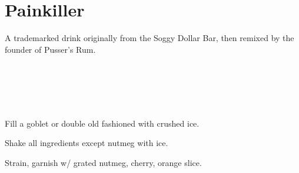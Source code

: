 \section[Painkiller]{Painkiller~}


\begin{recipestats}[
	servings=1,
	preptime=5~\minute,
	original=\citefield{pussersPainkiller}{shorttitle} \cite{pussersPainkiller}
]
\end{recipestats}


\begin{recipeabstract}
	A trademarked drink originally from the Soggy Dollar Bar, then remixed by the founder of Pusser's Rum.
\end{recipeabstract}


\begin{ingredientcolumns}[1]
	\begin{ingredientblock}
		\\
		\\
		\\
		\\
	\end{ingredientblock}
\end{ingredientcolumns}


\begin{preparation}
\item Fill a goblet or double old fashioned with crushed ice.
\item Shake all ingredients except nutmeg with ice.
\item Strain, garnish w/ grated nutmeg, cherry, orange slice.
\end{preparation}


\recipeend%
